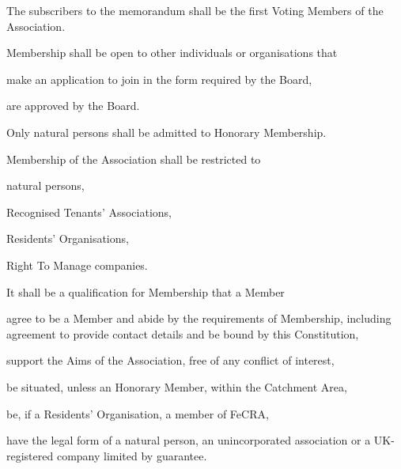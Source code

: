 \documentclass[10pt]{mk-articles-of-association}
\newcommand{\EC}[0]{Board}
\newcommand{\RA}[0]{Residents' Organisation}
\newcommand{\RTA}[0]{Recognised Tenants' Association}
\begin{document}
\begin{constenum}

  \item The subscribers to the memorandum shall be the first Voting Members
    of the Association.

  \item Membership shall be open to other individuals or organisations that
    \begin{constenum}
      \item make an application to join in the form required by the \EC, \ITand
      \item are approved by the \EC.
    \end{constenum}

  \item Only natural persons shall be admitted to Honorary Membership.

  \item Membership of the Association shall be restricted to
    \begin{constenum}
    \item natural persons,
    \item \RTA{}s,
    \item \RA{}s,
    \item Right To Manage companies.
    \end{constenum}

  \item It shall be a qualification for Membership that a Member
    \begin{constenum}

    \item agree to be a Member and abide by the requirements of
      Membership, including agreement to provide contact details and
      be bound by this Constitution,

    \item support the Aims of the Association, free of any conflict
      of interest,

    \item be situated, unless an Honorary Member,
      within the Catchment Area,\label{catchmentqual}
      
    \item be, if a \RA, a member of FeCRA, \ITand

    \item have the legal form of a natural person, an unincorporated
      association or a UK-registered company limited by guarantee.

    \end{constenum}


\end{constenum}
\end{document}
